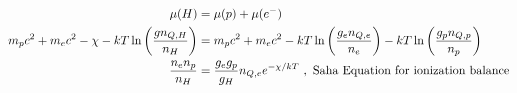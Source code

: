 \begin{align}
\mu(H) &= \mu(p) + \mu(e^-)\\
m_pc^2 + m_ec^2 - \chi - kT \ln \left( \frac{gn_{Q,H}}{n_H} \right) &= m_pc^2+m_ec^2 - kT\ln \left( \frac{g_e n_{Q,e}}{n_e} \right) -  kT\ln \left( \frac{g_p n_{Q,p}}{n_p} \right)\\
\frac{n_e  n_p}{n_H} &= \frac{g_eg_p}{g_H}n_{Q,e} e^{-\chi/kT}~,\text{ Saha Equation for ionization balance}
\end{align}
